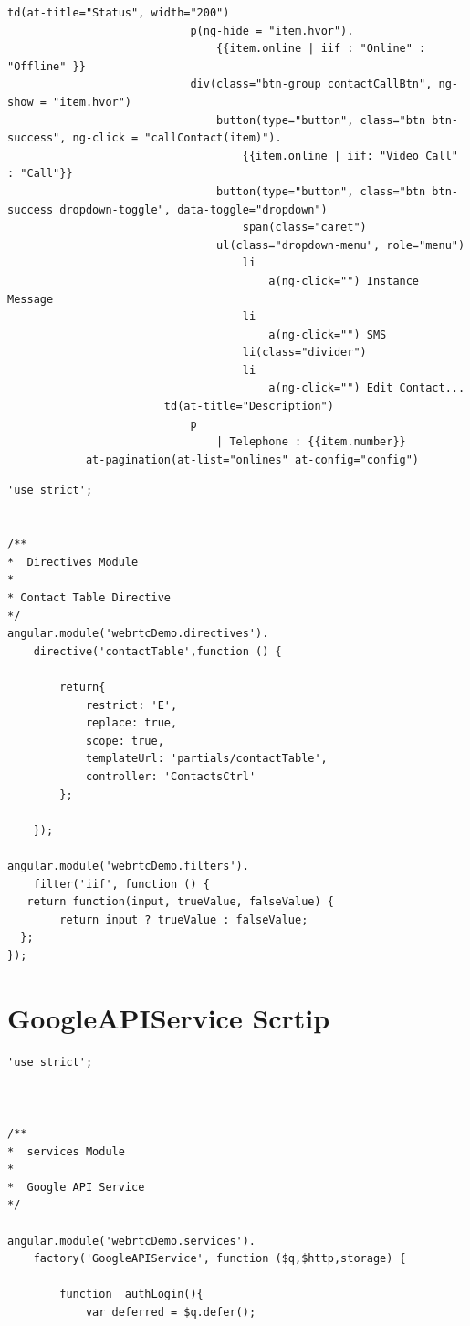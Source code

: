 \begin{appendices}
\begin{lstlisting}[caption={contactTable.jade in application client},label={code:contact_table}]
						td(at-title="Status", width="200")
							p(ng-hide = "item.hvor").
								{{item.online | iif : "Online" : "Offline" }}
							div(class="btn-group contactCallBtn", ng-show = "item.hvor")
								button(type="button", class="btn btn-success", ng-click = "callContact(item)").
									{{item.online | iif: "Video Call" : "Call"}}
								button(type="button", class="btn btn-success dropdown-toggle", data-toggle="dropdown")
									span(class="caret")
								ul(class="dropdown-menu", role="menu")
									li
										a(ng-click="") Instance Message
									li
										a(ng-click="") SMS
									li(class="divider")
									li
										a(ng-click="") Edit Contact...
						td(at-title="Description")
							p
								| Telephone : {{item.number}}
			at-pagination(at-list="onlines" at-config="config")
\end{lstlisting}

\begin{lstlisting}[caption={ContactTableDirective.js in application client},label={code:contact_table_dir}]
'use strict';


/**
*  Directives Module
*
* Contact Table Directive
*/
angular.module('webrtcDemo.directives').
	directive('contactTable',function () {

		return{
			restrict: 'E',
			replace: true,
			scope: true,
			templateUrl: 'partials/contactTable',
			controller: 'ContactsCtrl'
		};

	});

angular.module('webrtcDemo.filters').
	filter('iif', function () {
   return function(input, trueValue, falseValue) {
        return input ? trueValue : falseValue;
  };
});
\end{lstlisting}

\section{GoogleAPIService Scrtip} \label{app:google_api}

\begin{lstlisting}[caption={GoogleAPIService.js in application client},label={code:google_api}]
'use strict';



/**
*  services Module
*
*  Google API Service
*/

angular.module('webrtcDemo.services').
	factory('GoogleAPIService', function ($q,$http,storage) {

		function _authLogin(){
			var deferred = $q.defer();


\end{lstlisting}
\end{appendices}
